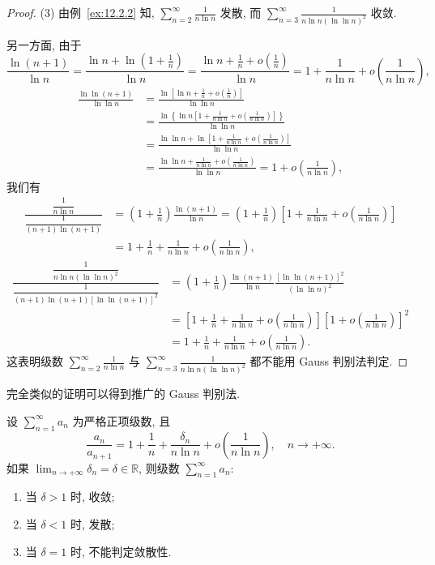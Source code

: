 \begin{proof}
(3) 由例~\ref{ex:12.2.2} 知, $\sum_{n=2}^{\infty}\frac{1}{n\ln n}$ 发散, 而 $\sum_{n=3}^{\infty}\frac{1}{n\ln n(\ln\ln n)^{2}}$ 收敛.

另一方面, 由于
\[
  \frac{\ln(n+1)}{\ln n}
  =\frac{\ln n+\ln\left(1+\frac{1}{n}\right)}{\ln n}
  =\frac{\ln n+\frac{1}{n}+o\left(\frac{1}{n}\right)}{\ln n}
  =1+\frac{1}{n\ln n}+o\left(\frac{1}{n\ln n}\right),
\]
\begin{align*}
  \frac{\ln\ln(n+1)}{\ln\ln n}
  &=\frac{\ln\left[\ln n+\frac{1}{n}+o\left(\frac{1}{n}\right)\right]}{\ln\ln n} \\
  &=\frac{\ln\left\{\ln n\left[1+\frac{1}{n\ln n}+o\left(\frac{1}{n\ln n}\right)\right]\right\}}{\ln\ln n} \\
  &=\frac{\ln\ln n+\ln\left[1+\frac{1}{n\ln n}+o\left(\frac{1}{n\ln n}\right)\right]}{\ln\ln n} \\
  &=\frac{\ln\ln n+\frac{1}{n\ln n}+o\left(\frac{1}{n\ln n}\right)}{\ln\ln n}
   =1+o\left(\frac{1}{n\ln n}\right),
\end{align*}
我们有
\begin{align*}
  \frac{\dfrac{1}{n\ln n}}{\dfrac{1}{(n+1)\ln(n+1)}}
  &=\left(1+\frac{1}{n}\right)\frac{\ln(n+1)}{\ln n}
   =\left(1+\frac{1}{n}\right)\left[1+\frac{1}{n\ln n}+o\left(\frac{1}{n\ln n}\right)\right] \\
  &=1+\frac{1}{n}+\frac{1}{n\ln n}+o\left(\frac{1}{n\ln n}\right),
\end{align*}
\begin{align*}
  \frac{\dfrac{1}{n\ln n(\ln\ln n)^{2}}}
        {\dfrac{1}{(n+1)\ln(n+1)\left[\ln\ln(n+1)\right]^{2}}}
  &=\left(1+\frac{1}{n}\right)\frac{\ln(n+1)}{\ln n}
   \frac{\left[\ln\ln(n+1)\right]^{2}}{(\ln\ln n)^{2}} \\
  &=\left[1+\frac{1}{n}+\frac{1}{n\ln n}+o\left(\frac{1}{n\ln n}\right)\right]
   \left[1+o\left(\frac{1}{n\ln n}\right)\right]^{2} \\
  &=1+\frac{1}{n}+\frac{1}{n\ln n}+o\left(\frac{1}{n\ln n}\right).
\end{align*}
这表明级数 $\sum_{n=2}^{\infty}\frac{1}{n\ln n}$ 与 $\sum_{n=3}^{\infty}\frac{1}{n\ln n(\ln\ln n)^{2}}$ 都不能用 Gauss 判别法判定.
\end{proof}

完全类似的证明可以得到推广的 Gauss 判别法.

\begin{theoremp}\label{thm:12.2.7p}
设 $\sum_{n=1}^{\infty}a_{n}$ 为严格正项级数, 且
\[
  \frac{a_{n}}{a_{n+1}}=1+\frac{1}{n}+\frac{\delta_{n}}{n\ln n}
   +o\left(\frac{1}{n\ln n}\right),\quad n\to+\infty.
\]
如果 $\lim_{n\to+\infty}\delta_{n}=\delta\in\mathbb{R}$, 则级数 $\sum_{n=1}^{\infty}a_{n}$:
\begin{enumerate}
  \item 当 $\delta>1$ 时, 收敛;
  \item 当 $\delta<1$ 时, 发散;
  \item 当 $\delta=1$ 时, 不能判定敛散性.
\end{enumerate}
\end{theoremp}

